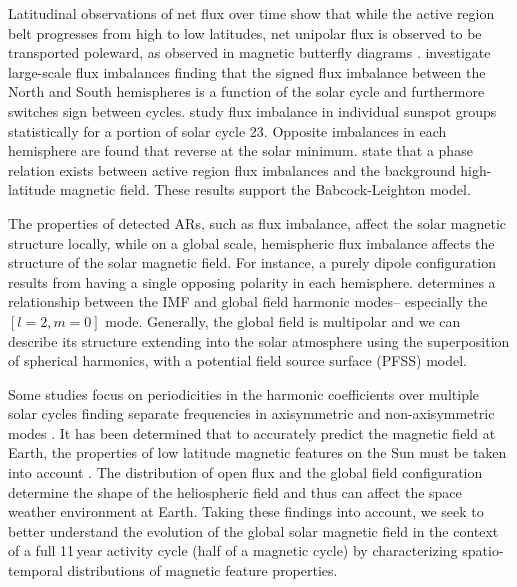Latitudinal observations of net flux over time show that while the active region belt progresses from high to low latitudes, net unipolar flux is observed to be transported poleward, as observed in magnetic butterfly diagrams \citep{Harvey:1992}. \citet{Choudhary:2002} investigate large-scale flux imbalances finding that the signed flux imbalance between the North and South hemispheres is a function of the solar cycle and furthermore switches sign between cycles. \citet{zharkov:2006} study flux imbalance in individual sunspot groups statistically for a portion of solar cycle 23. Opposite imbalances in each hemisphere are found that reverse at the solar minimum. \citet{Zharkov:2008} state that a phase relation exists between active region flux imbalances and the background high-latitude magnetic field. These results support the Babcock-Leighton model.

The properties of detected ARs, such as flux imbalance, affect the solar magnetic structure locally, while on a global scale, hemispheric flux imbalance affects the structure of the solar magnetic field. For instance, a purely dipole configuration results from having a single opposing polarity in each hemisphere. 
\citet{mordvinov:2007} determines a relationship between the IMF and global field harmonic modes-- especially the $[l=2,m=0]$ mode.
Generally, the global field is multipolar and we can describe its structure extending into the solar atmosphere using the superposition of spherical harmonics, with a potential field source surface (PFSS) model. 

Some studies focus on periodicities in the harmonic coefficients over multiple solar cycles finding separate frequencies in axisymmetric and non-axisymmetric modes \citep{stenflo:1986, stenflo:1988, knaack:2005}.
It has been determined that to accurately predict the magnetic field at Earth, the properties of low latitude magnetic features on the Sun must be taken into account \citep{schussler:2006, wang:2003a, Schrijver:2003}. The distribution of open flux and the global field configuration determine the shape of the heliospheric field and thus can affect the space weather environment at Earth.
Taking these findings into account, we seek to better understand the evolution of the global solar magnetic field in the context of a full 11\,year activity cycle (half of a magnetic cycle) by characterizing spatio-temporal distributions of magnetic feature properties.

